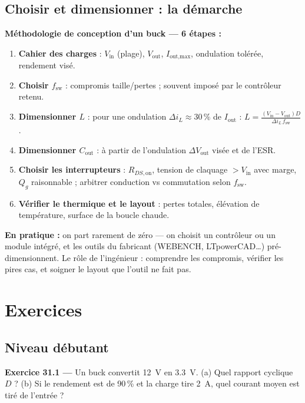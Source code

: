 \documentclass[12pt,a4paper,twoside]{book}
\begin{document}
\subsection{Choisir et dimensionner : la démarche}

\begin{pratique}
\textbf{Méthodologie de conception d'un buck --- 6 étapes :}
\begin{enumerate}[nosep]
\item \textbf{Cahier des charges} : $V_{\text{in}}$ (plage), $V_{\text{out}}$, $I_{\text{out,max}}$, ondulation tolérée, rendement visé.
\item \textbf{Choisir $f_{\text{sw}}$} : compromis taille/pertes ; souvent imposé par le contrôleur retenu.
\item \textbf{Dimensionner $L$} : pour une ondulation $\Delta i_L \approx 30\,\%$ de $I_{\text{out}}$ : $L = \frac{(V_{\text{in}}-V_{\text{out}})D}{\Delta i_L\,f_{\text{sw}}}$.
\item \textbf{Dimensionner $C_{\text{out}}$} : à partir de l'ondulation $\Delta V_{\text{out}}$ visée et de l'ESR.
\item \textbf{Choisir les interrupteurs} : $R_{DS,\text{on}}$, tension de claquage $> V_{\text{in}}$ avec marge, $Q_g$ raisonnable ; arbitrer conduction vs commutation selon $f_{\text{sw}}$.
\item \textbf{Vérifier le thermique et le layout} : pertes totales, élévation de température, surface de la boucle chaude.
\end{enumerate}
\textbf{En pratique :} on part rarement de zéro --- on choisit un contrôleur ou un module intégré, et les outils du fabricant (WEBENCH, LTpowerCAD\ldots) pré-dimensionnent. Le rôle de l'ingénieur : comprendre les compromis, vérifier les pires cas, et soigner le layout que l'outil ne fait pas.
\end{pratique}

\section*{Exercices}

\subsection*{Niveau débutant}

\textbf{Exercice 31.1 ---} Un buck convertit \SI{12}{V} en \SI{3.3}{V}. (a) Quel rapport cyclique $D$ ? (b) Si le rendement est de 90\,\% et la charge tire \SI{2}{A}, quel courant moyen est tiré de l'entrée ?
\end{document}
